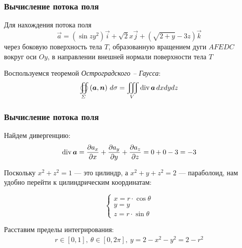 \begin{frame}\frametitle{Вычисление потока поля}
	Для нахождения потока поля
	\begin{equation*}
		\vec a = (\sin zy^2) \vec i + \sqrt{2} x \vec j + (\sqrt{2+y} -3z) \vec k
	\end{equation*}
	через боковую поверхность тела \(T\), образованную вращением дуги \(AFEDC\)
	вокруг оси \(Oy\), в направлении внешней нормали поверхности тела \(T\)


	Воспользуемся теоремой \textit{Остроградского -- Гаусса}:
	\begin{equation*}
		\oiint\limits_{\Sigma}\left( \vec {a}, \vec {n} \right) \, d\sigma = \iiint\limits_V \Div \vec {a} \, dxdydz
	\end{equation*}
\end{frame}


\begin{frame}\frametitle{Вычисление потока поля}
	Найдем дивергенцию:
	\begin{equation*}
		\Div \vec a = \frac{\partial a_x}{\partial x} +  \frac{\partial a_y}{\partial y} +  \frac{\partial a_z}{\partial z} = 0 + 0 - 3 = -3
	\end{equation*}

	Поскольку $x^2 + z^2 = 1$ — это цилиндр, а $x^2 + y + z^2 = 2$ — параболоид, нам удобно перейти к цилиндрическим координатам:

	\begin{equation*}
		\begin{cases}
			x = r \cdot \cos \theta \\
			y = y                    \\
			z = r \cdot \sin \theta
		\end{cases}
	\end{equation*}

	Расставим пределы интегрирования:
	\begin{align*}
		r \in [0, 1], \
		\theta \in [0, 2\pi], \
		y = 2 - x^2 - y^2 = 2 - r^2
	\end{align*}
\end{frame}

